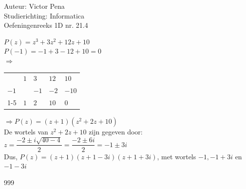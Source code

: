 \documentclass[a4paper]{article}
\begin{document}
	
	\noindent \large Auteur: Victor Pena \\
	\noindent \large Studierichting: Informatica\\
	\noindent \large Oefeningenreeks 1D nr. 21.4\\
	
	\medskip
	
	\normalsize 
	
	$P(z)=z^3 +3z^2 + 12z + 10$ \\
	
	
	$P(-1)=-1 + 3 -12 +10 = 0$ \\

	$\Rightarrow$ \begin{tabular}{l|lll|l}
		 & $1$   & $3$  & $12$ &$10$ \\
	$-1$ &       & $-1$ & $-2$ &$-10$ \\  \cline{1-5}
		 & $1$   & $2 $ & $10$ &$0$
	\end{tabular} $\Rightarrow P(z) = (z+1)(z^2 + 2z + 10)$ \\
	

	De wortels van $z^2 + 2z + 10$ zijn gegeven door: \\
	
	$z = \dfrac{-2 \pm i\sqrt{40-4}}{2} = \dfrac{-2 \pm 6i}{2} = -1 \pm 3i$\\
	
	
	Dus, $P(z) = (z+1)(z+1-3i)(z+1+3i)$, met wortels $-1,-1+3i$ en $-1-3i$ \\
	
	
	
	
	
	
	
	
	
	
	
	
	\begin{thebibliography}{999}
	\end{thebibliography}
\end{document}
